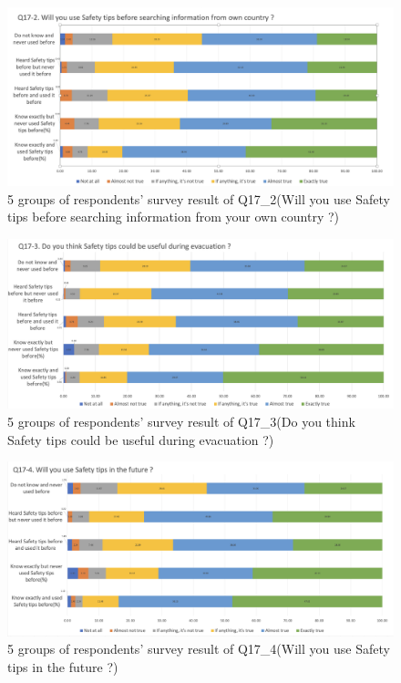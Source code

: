 \begin{figure}[h]
  \includegraphics[width=0.8\linewidth]{Figure/Figure20.jpg}
  \centering
  \caption[5 groups of respondents' survey result of Q17\_2]{5 groups of respondents' survey result of Q17\_2(Will you use Safety tips before searching information from your own country ?)}
  \label{fig20}
\end{figure}

\begin{figure}[h]
  \includegraphics[width=0.8\linewidth]{Figure/Figure21.jpg}
  \centering
  \caption[5 groups of respondents' survey result of Q17\_3]{5 groups of respondents' survey result of Q17\_3(Do you think Safety tips could be useful during evacuation ?)}
  \label{fig21}
\end{figure}

\begin{figure}[h]
  \includegraphics[width=0.8\linewidth]{Figure/Figure22.jpg}
  \centering
  \caption[5 groups of respondents' survey result of Q17\_4]{5 groups of respondents' survey result of Q17\_4(Will you use Safety tips in the future ?)}
  \label{fig22}
\end{figure}
\fi

